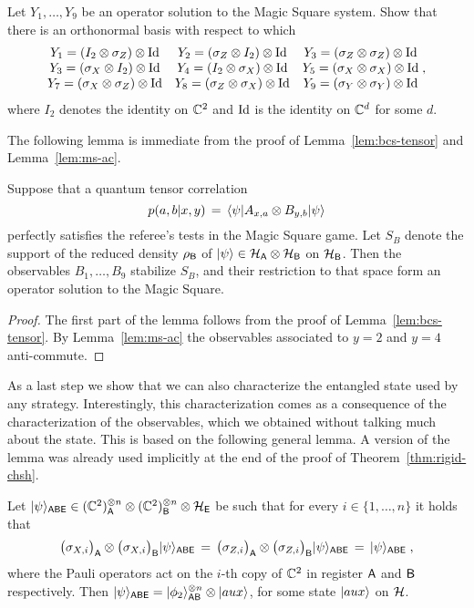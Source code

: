\begin{exercise}\label{ex:ms-opsol}
Let $Y_1,\ldots,Y_9$ be an operator solution to the Magic Square system. Show that there is an orthonormal basis with respect to which 
\[ \begin{matrix} Y_1 = (I_2 \otimes \sigma_Z)\otimes \mathop{\rm Id}\nolimits & Y_2 = (\sigma_Z\otimes I_2)\otimes \mathop{\rm Id}\nolimits & Y_3=(\sigma_Z\otimes \sigma_Z)\otimes \mathop{\rm Id}\nolimits \\
Y_3 = (\sigma_X\otimes I_2)\otimes \mathop{\rm Id}\nolimits & Y_4 = (I_2\otimes \sigma_X)\otimes \mathop{\rm Id}\nolimits & Y_5 = (\sigma_X\otimes \sigma_X)\otimes \mathop{\rm Id}\nolimits \\ Y_7 = (\sigma_X\otimes \sigma_Z)\otimes \mathop{\rm Id}\nolimits & Y_8=(\sigma_Z\otimes \sigma_X)\otimes \mathop{\rm Id}\nolimits & Y_9 = (\sigma_Y\otimes \sigma_Y)\otimes \mathop{\rm Id}\nolimits \end{matrix}\;,\]
where $I_2$ denotes the identity on $\mathbb{C}^2$ and $\mathop{\rm Id}\nolimits$ is the identity on $\mathbb{C}^d$ for some $d$.
\end{exercise}


The following lemma is immediate from the proof of Lemma~\ref{lem:bcs-tensor} and Lemma~\ref{lem:ms-ac}.  

\begin{lemma}\label{lem:ms-perfect}
Suppose that a quantum tensor correlation
\[ p(a,b|x,y)\,=\, \langle\psi| A_{x,a} \otimes B_{y,b}|\psi\rangle\]
  perfectly satisfies the referee's tests in the Magic Square game. Let $S_B$ denote the support of the reduced density $\rho_{\textsf{B}}$ of $|\psi\rangle\in\mathcal{H}_{\textsf{A}}\otimes \mathcal{H}_{\textsf{B}}$ on $\mathcal{H}_{\textsf{B}}$.  Then the observables $B_1,\ldots,B_9$ stabilize $S_B$, and their restriction to that space form an operator solution to the Magic Square.
\end{lemma}

\begin{proof}
The first part of the lemma follows from the proof of Lemma~\ref{lem:bcs-tensor}. By Lemma~\ref{lem:ms-ac} the observables associated to $y=2$ and $y=4$ anti-commute. 
\end{proof}


As a last step we show that we can also characterize the entangled state used by any strategy. Interestingly, this characterization comes as a consequence of the characterization of the observables, which we obtained without talking much about the state. This is based on the following general lemma. A version of the lemma was already used implicitly at the end of the proof of Theorem~\ref{thm:rigid-chsh}.

\begin{lemma}\label{lem:epr-stable}
Let $|\psi\rangle_{{\textsf{ABE}}} \in (\mathbb{C}^2)_{\textsf{A}}^{\otimes n} \otimes (\mathbb{C}^2)_{\textsf{B}}^{\otimes n} \otimes \mathcal{H}_{\textsf{E}}$ be such that for every $i\in \{1,\ldots, n\}$ it holds that 
\[\big(\sigma_{X,i}\big)_{\textsf{A}} \otimes \big(\sigma_{X,i}\big)_{\textsf{B}} |\psi\rangle_{{\textsf{ABE}}} \,=\, \big(\sigma_{Z,i}\big)_{\textsf{A}} \otimes \big(\sigma_{Z,i}\big)_{\textsf{B}} |\psi\rangle_{{\textsf{ABE}}} \,=\,|\psi\rangle_{\textsf{ABE}}\;,\]
where the Pauli operators act on the $i$-th copy of $\mathbb{C}^2$ in register ${\textsf{A}}$ and ${\textsf{B}}$ respectively. Then $|\psi\rangle_{{\textsf{ABE}}} = |\phi_2\rangle^{\otimes n}_{{\textsf{AB}}} \otimes |aux\rangle$, for some state $|aux\rangle$ on $\mathcal{H}$. 
\end{lemma}

